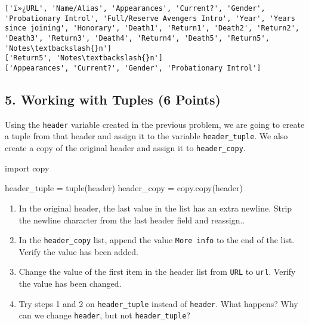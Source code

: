 \documentclass[11pt]{article}
\providecommand{\tightlist}{%
      \setlength{\itemsep}{0pt}\setlength{\parskip}{0pt}}
\newenvironment{Shaded}{}{}
\newcommand{\NormalTok}[1]{{#1}}
\newcommand{\ImportTok}[1]{{#1}}
\newcommand{\OperatorTok}[1]{\textcolor[rgb]{0.40,0.40,0.40}{{#1}}}
\newcommand{\BuiltInTok}[1]{{#1}}
\begin{document}
    \begin{Verbatim}[commandchars=\\\{\}]
['ï»¿URL', 'Name/Alias', 'Appearances', 'Current?', 'Gender', 'Probationary Introl', 'Full/Reserve Avengers Intro', 'Year', 'Years since joining', 'Honorary', 'Death1', 'Return1', 'Death2', 'Return2', 'Death3', 'Return3', 'Death4', 'Return4', 'Death5', 'Return5', 'Notes\textbackslash{}n']
['Return5', 'Notes\textbackslash{}n']
['Appearances', 'Current?', 'Gender', 'Probationary Introl']

    \end{Verbatim}

    \hypertarget{working-with-tuples-6-points}{%
\subsection{5. Working with Tuples (6
Points)}\label{working-with-tuples-6-points}}

Using the \texttt{header} variable created in the previous problem, we
are going to create a tuple from that header and assign it to the
variable \texttt{header\_tuple}. We also create a copy of the original
header and assign it to \texttt{header\_copy}.

\begin{Shaded}
\begin{Highlighting}[]
\ImportTok{import}\NormalTok{ copy }

\NormalTok{header_tuple }\OperatorTok{=} \BuiltInTok{tuple}\NormalTok{(header)}
\NormalTok{header_copy }\OperatorTok{=}\NormalTok{ copy.copy(header)}
\end{Highlighting}
\end{Shaded}

\begin{enumerate}
\def\labelenumi{\arabic{enumi}.}
\tightlist
\item
  In the original header, the last value in the list has an extra
  newline. Strip the newline character from the last header field and
  reassign..
\item
  In the \texttt{header\_copy} list, append the value
  \texttt{More\ info} to the end of the list. Verify the value has been
  added.
\item
  Change the value of the first item in the header list from
  \texttt{URL} to \texttt{url}. Verify the value has been changed.
\item
  Try steps 1 and 2 on \texttt{header\_tuple} instead of
  \texttt{header}. What happens? Why can we change \texttt{header}, but
  not \texttt{header\_tuple}?
\end{enumerate}
\end{document}
